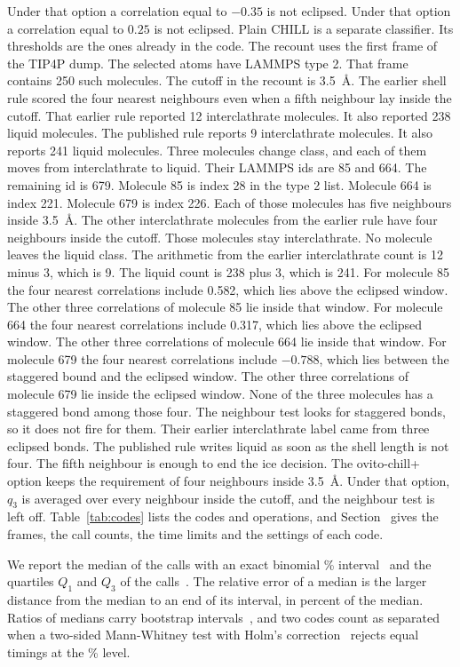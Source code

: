 \documentclass[preprint,12pt]{elsarticle}
\begin{document}
Under that option a correlation equal to $-0.35$ is not eclipsed.
Under that option a correlation equal to $0.25$ is not eclipsed.
Plain CHILL is a separate classifier.
Its thresholds are the ones already in the code.
The recount uses the first frame of the TIP4P dump.
The selected atoms have LAMMPS type 2.
That frame contains 250 such molecules.
The cutoff in the recount is 3.5~\AA.
The earlier shell rule scored the four nearest neighbours even when a
fifth neighbour lay inside the cutoff.
That earlier rule reported 12 interclathrate molecules.
It also reported 238 liquid molecules.
The published rule reports 9 interclathrate molecules.
It also reports 241 liquid molecules.
Three molecules change class, and each of them moves from interclathrate
to liquid.
Their LAMMPS ids are 85 and 664.
The remaining id is 679.
Molecule 85 is index 28 in the type 2 list.
Molecule 664 is index 221.
Molecule 679 is index 226.
Each of those molecules has five neighbours inside 3.5~\AA.
The other interclathrate molecules from the earlier rule have four
neighbours inside the cutoff.
Those molecules stay interclathrate.
No molecule leaves the liquid class.
The arithmetic from the earlier interclathrate count is 12 minus 3,
which is 9.
The liquid count is 238 plus 3, which is 241.
For molecule 85 the four nearest correlations include 0.582, which lies
above the eclipsed window.
The other three correlations of molecule 85 lie inside that window.
For molecule 664 the four nearest correlations include 0.317, which lies
above the eclipsed window.
The other three correlations of molecule 664 lie inside that window.
For molecule 679 the four nearest correlations include $-0.788$, which
lies between the staggered bound and the eclipsed window.
The other three correlations of molecule 679 lie inside the eclipsed
window.
None of the three molecules has a staggered bond among those four.
The neighbour test looks for staggered bonds, so it does not fire for
them.
Their earlier interclathrate label came from three eclipsed bonds.
The published rule writes liquid as soon as the shell length is not
four.
The fifth neighbour is enough to end the ice decision.
The ovito-chill+ option keeps the requirement of four neighbours inside
3.5~\AA.
Under that option, $q_3$ is averaged over every neighbour inside the
cutoff, and the neighbour test is left off.
Table~\ref{tab:codes} lists the codes and operations, and Section~ gives the frames, the call counts, the time limits and the settings of each code.

We report the median of the calls with an exact binomial \% interval~\cite{hollander2014nonparametric} and the quartiles $Q_1$ and $Q_3$ of the calls~\cite{hyndman1996sample}.
The relative error of a median is the larger distance from the median to an end of its interval, in percent of the median.
Ratios of medians carry bootstrap intervals~\cite{efron1993bootstrap}, and two codes count as separated when a two-sided Mann-Whitney test with Holm's correction~\cite{holm1979simple} rejects equal timings at the \% level.
\end{document}
